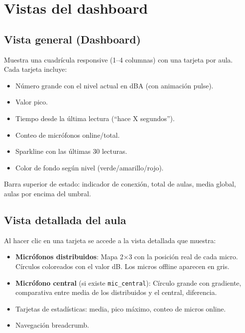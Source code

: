 \documentclass[12pt,a4paper]{report}
\begin{document}
\section{Vistas del dashboard}

\subsection{Vista general (Dashboard)}

Muestra una cuadr\'icula responsive (1--4 columnas) con una tarjeta por aula. Cada tarjeta incluye:

\begin{itemize}
    \item N\'umero grande con el nivel actual en dBA (con animaci\'on pulse).
    \item Valor pico.
    \item Tiempo desde la \'ultima lectura (``hace X segundos'').
    \item Conteo de micr\'ofonos online/total.
    \item Sparkline con las \'ultimas 30 lecturas.
    \item Color de fondo seg\'un nivel (verde/amarillo/rojo).
\end{itemize}

Barra superior de estado: indicador de conexi\'on, total de aulas, media global, aulas por encima del umbral.

\subsection{Vista detallada del aula}

Al hacer clic en una tarjeta se accede a la vista detallada que muestra:

\begin{itemize}
    \item \textbf{Micr\'ofonos distribuidos}: Mapa 2$\times$3 con la posici\'on real de cada micro. C\'irculos coloreados con el valor dB. Los micros offline aparecen en gris.
    \item \textbf{Micr\'ofono central} (si existe \texttt{mic\_central}): C\'irculo grande con gradiente, comparativa entre media de los distribuidos y el central, diferencia.
    \item Tarjetas de estad\'isticas: media, pico m\'aximo, conteo de micros online.
    \item Navegaci\'on breadcrumb.
\end{itemize}
\end{document}

